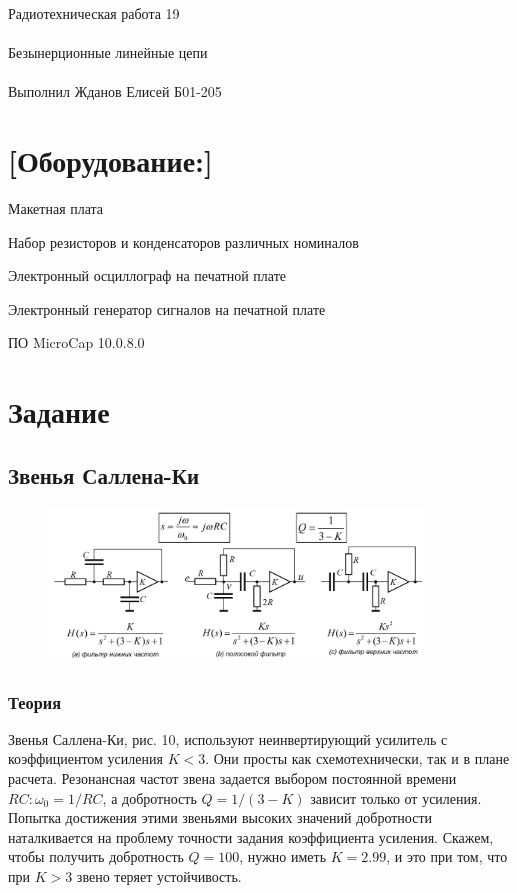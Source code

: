 \documentclass{astroedu-lab}
\begin{document}
\pagestyle{plain}

\begin{problem}{\huge Радиотехническая работа 19\\\\Безынерционные линейные цепи\\\\Выполнил Жданов Елисей Б01-205}

\section{[Оборудование:]}

Макетная плата

Набор резисторов и конденсаторов различных номиналов

Электронный осциллограф на печатной плате

Электронный генератор сигналов на печатной плате

ПО MicroCap 10.0.8.0

\section{Задание}

\subsection{Звенья Саллена-Ки}

\begin{figure}[!h]
	\centering
	\includegraphics[width=0.9\textwidth]{sall.png}
	\label{fig:boiler}
\end{figure}

\subsubsection{Теория}

Звенья Саллена-Ки, рис. 10, используют неинвертирующий усилитель с коэффициентом усиления $K<3$. Они просты как схемотехнически, так и в плане расчета. Резонансная частот звена задается выбором постоянной времени $R C: \omega_0=1 / R C$, а добротность $Q=1 /(3-K)$ зависит только от усиления. Попытка достижения этими звеньями высоких значений добротности наталкивается на проблему точности задания коэффициента усиления. Скажем, чтобы получить добротность $Q=100$, нужно иметь $K=2.99$, и это при том, что при $K>3$ звено теряет устойчивость.


\end{problem}
\end{document}
